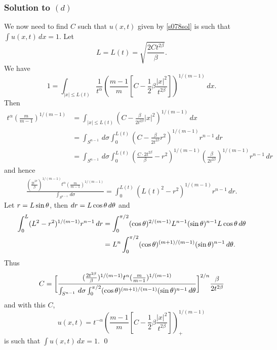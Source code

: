 \subsubsection*{Solution to $(d)$}
We now need to find $C$ such that $u(x, t)$ given by \eqref{s078sol} is such that $\int u(x, t)\, dx = 1$.
Let $$L = L(t) = \sqrt{\frac{2Ct^{2\beta}}{\beta}}.$$
We have
$$1 = \int_{|x| \leq L(t)}\frac{1}{t^{\alpha}}(\frac{m - 1}{m}[C - \frac{1}{2}\beta\frac{|x|^{2}}{t^{2\beta}}])^{1/(m - 1)}\, dx.$$
Then
\begin{align*}
t^{\alpha}(\frac{m}{m - 1})^{1/(m - 1)} &= \int_{|x| \leq L(t)}(C - \frac{\beta}{2t^{2\beta}}|x|^{2})^{1/(m - 1)}\, dx\\
&= \int_{S^{n - 1}}\, d\sigma\int_{0}^{L(t)}(C - \frac{\beta}{2t^{2\beta}}r^{2})^{1/(m - 1)}r^{n - 1}\, dr\\
&= \int_{S^{n - 1}}\, d\sigma\int_{0}^{L(t)}(\frac{C\cdot 2t^{2\beta}}{\beta} - r^{2})^{1/(m -1)}(\frac{\beta}{2t^{2\beta}})^{1/(m - 1)}r^{n- 1}\, dr
\end{align*}
and hence
\begin{align*}
\frac{(\frac{2t^{2\beta}}{\beta})^{1/(m - 1)}t^{\alpha}(\frac{m}{m - 1})^{1/(m - 1)}}{\int_{S^{n - 1}}\, d\sigma} = \int_{0}^{L(t)}(L(t)^{2} - r^{2})^{1/(m - 1)}r^{n - 1}\, dr.
\end{align*}
Let $r = L\sin\theta$, then $dr = L\cos\theta\, d\theta$ and
\begin{align*}
\int_{0}^{L}(L^{2} - r^{2})^{1/(m - 1)}r^{n - 1}\, dr &= \int_{0}^{\pi/2}(\cos\theta)^{2/(m - 1)}L^{n - 1}(\sin \theta)^{n - 1}L\cos\theta\, d\theta\\
& = L^{n}\int_{0}^{\pi/2}(\cos\theta)^{(m + 1)/(m - 1)}(\sin\theta)^{n - 1}\, d\theta.
\end{align*}
Thus
\begin{align*}
\displaystyle C = \bigg[\frac{(\frac{2t^{2\beta}}{\beta})^{1/(m - 1)}t^{\alpha}(\frac{m}{m - 1})^{1/(m - 1)}}{\int_{S^{n - 1}}\, d\sigma\int_{0}^{\pi/2}(\cos\theta)^{(m + 1)/(m - 1)}(\sin\theta)^{n - 1}\, d\theta}\bigg]^{2/n}\frac{\beta}{2t^{2\beta}}
\end{align*}
and with this $C$,
$$u(x, t) = t^{-\alpha}(\frac{m - 1}{m}[C - \frac{1}{2}\beta\frac{|x|^{2}}{t^{2\beta}}])_{+}^{1/(m - 1)}$$
is such that $\int u(x, t)\, dx = 1$.
\hfill\qed
